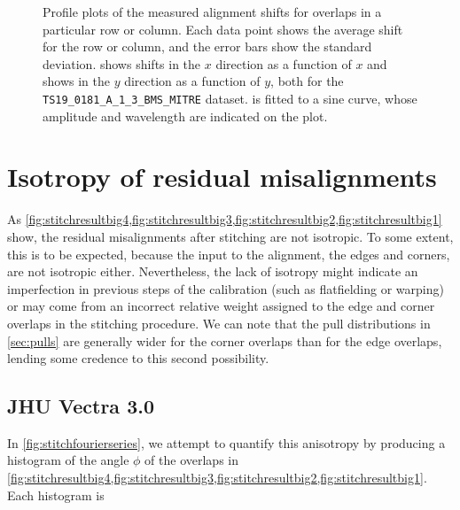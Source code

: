 \documentclass{article}
\begin{document}
\begin{figure}[ht]
\begin{subfigure}{0.49\linewidth}
		\caption{}
		\label{fig:sinewaveyyAKY}
	\end{subfigure}
	\caption{Profile plots of the measured alignment shifts for overlaps in a particular row or column.  Each data point shows the average shift for the row or column, and the error bars show the standard deviation.   shows shifts in the $x$ direction as a function of $x$ and  shows in the $y$ direction as a function of $y$, both for the \texttt{TS19\_0181\_A\_1\_3\_BMS\_MITRE} dataset.   is fitted to a sine curve, whose amplitude and wavelength are indicated on the plot.}
	\label{fig:sinewavesAKY}
\end{figure}

\clearpage

\section{Isotropy of residual misalignments}

As \cref{fig:stitchresultbig4,fig:stitchresultbig3,fig:stitchresultbig2,fig:stitchresultbig1} show, the residual misalignments after stitching are not isotropic.  To some extent, this is to be expected, because the input to the alignment, the edges and corners, are not isotropic either.  Nevertheless, the lack of isotropy might indicate an imperfection in previous steps of the calibration (such as flatfielding or warping) or may come from an incorrect relative weight assigned to the edge and corner overlaps in the stitching procedure.  We can note that the pull distributions in \cref{sec:pulls} are generally wider for the corner overlaps than for the edge overlaps, lending some credence to this second possibility.

\subsection{JHU Vectra 3.0}

In \cref{fig:stitchfourierseries}, we attempt to quantify this anisotropy by producing a histogram of the angle $\phi$ of the overlaps in \cref{fig:stitchresultbig4,fig:stitchresultbig3,fig:stitchresultbig2,fig:stitchresultbig1}.  Each histogram is
\end{document}
